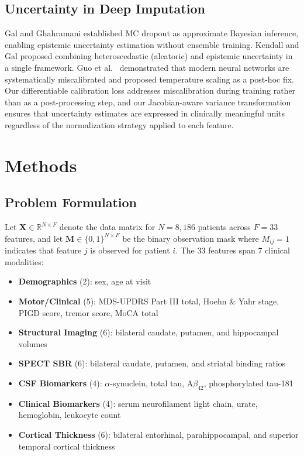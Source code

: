 \documentclass[journal,twoside,web]{ieeecolor}
\begin{document}
\subsection{Uncertainty in Deep Imputation}

Gal and Ghahramani \cite{gal2016dropout} established MC dropout as approximate Bayesian inference, enabling epistemic uncertainty estimation without ensemble training. Kendall and Gal \cite{kendall2017uncertainties} proposed combining heteroscedastic (aleatoric) and epistemic uncertainty in a single framework. Guo et al.\ \cite{guo2017calibration} demonstrated that modern neural networks are systematically miscalibrated and proposed temperature scaling as a post-hoc fix. Our differentiable calibration loss addresses miscalibration during training rather than as a post-processing step, and our Jacobian-aware variance transformation ensures that uncertainty estimates are expressed in clinically meaningful units regardless of the normalization strategy applied to each feature.

\section{Methods}
\label{sec:methods}

\subsection{Problem Formulation}

Let $\mathbf{X} \in \mathbb{R}^{N \times F}$ denote the data matrix for $N = 8{,}186$ patients across $F = 33$ features, and let $\mathbf{M} \in \{0,1\}^{N \times F}$ be the binary observation mask where $M_{ij} = 1$ indicates that feature $j$ is observed for patient $i$. The 33 features span 7 clinical modalities:

\begin{itemize}
    \item \textbf{Demographics} (2): sex, age at visit
    \item \textbf{Motor/Clinical} (5): MDS-UPDRS Part III total, Hoehn \& Yahr stage, PIGD score, tremor score, MoCA total
    \item \textbf{Structural Imaging} (6): bilateral caudate, putamen, and hippocampal volumes
    \item \textbf{SPECT SBR} (6): bilateral caudate, putamen, and striatal binding ratios
    \item \textbf{CSF Biomarkers} (4): $\alpha$-synuclein, total tau, A$\beta_{42}$, phosphorylated tau-181
    \item \textbf{Clinical Biomarkers} (4): serum neurofilament light chain, urate, hemoglobin, leukocyte count
    \item \textbf{Cortical Thickness} (6): bilateral entorhinal, parahippocampal, and superior temporal cortical thickness
\end{itemize}
\end{document}

